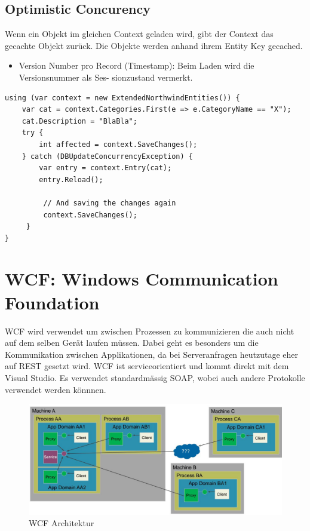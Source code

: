 \subsection{Optimistic Concurency}
Wenn ein Objekt im gleichen Context geladen wird, gibt der Context das gecachte Objekt zurück.
Die Objekte werden anhand ihrem Entity Key gecached.
\begin{itemize}
	\item Version Number pro Record (Timestamp): Beim Laden wird die Versionsnummer als Ses-
	sionzustand vermerkt.
\end{itemize}

\begin{lstlisting}
using (var context = new ExtendedNorthwindEntities()) {
	var cat = context.Categories.First(e => e.CategoryName == "X");
	cat.Description = "BlaBla";
	try {
		int affected = context.SaveChanges();
	} catch (DBUpdateConcurrencyException) {
		var entry = context.Entry(cat);
		entry.Reload();
	
		 // And saving the changes again
		 context.SaveChanges();
	 }
}
\end{lstlisting}

\section{WCF: Windows Communication Foundation}
WCF wird verwendet um zwischen Prozessen zu kommunizieren die auch nicht auf dem selben Gerät laufen müssen. Dabei geht es besonders um die Kommunikation zwischen Applikationen, da bei Serveranfragen heutzutage eher auf REST gesetzt wird. WCF ist serviceorientiert und kommt direkt mit dem Visual Studio. Es verwendet standardmässig SOAP, wobei auch andere Protokolle verwendet werden könnnen. 

\begin{figure}[h]
\centering
\includegraphics[width=0.8\linewidth]{images/wcf_architecture}
\caption{WCF Architektur}
\label{fig:wcfarchitecture}
\end{figure}

